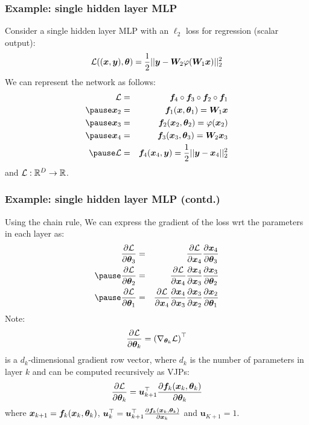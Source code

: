 \documentclass[smaller]{beamer}
\begin{document}
\begin{frame}
  \frametitle{Example: single hidden layer MLP}\pause

  Consider a single hidden layer MLP with an $\ell_2$ loss for regression (scalar output):\pause
  \begin{equation}
    \mathcal{L}((\bm x, \bm y),\bm{\theta}) = \frac12 ||\bm y - \bm W_2\varphi(\bm W_1\bm x)||_2^2
  \end{equation}
  \pause
  We can represent the network as follows:\pause
  \begin{eqnarray}
    \mc L &=& \bm f_4 \circ \bm f_3 \circ \bm f_2 \circ \bm f_1  \\\pause
    \bm x_2 &=& \bm f_1(\bm x, \bm\th_1) = \bm W_1 \bm x \\\pause
    \bm x_3 &=& \bm f_2(\bm x_2, \bm\th_2) = \varphi(\bm x_2) \\\pause
    \bm x_4 &=& \bm f_3(\bm x_3, \bm\th_3) = \bm W_2 \bm x_3 \\\pause
    \mc L &=& \bm f_4(\bm x_4, \bm y) = \fr12||\bm y - \bm x_4||_2^2
  \end{eqnarray}
  and $\mathcal L : \mathbb{R}^D \to \mathbb{R}$.
\end{frame}
\begin{frame}
  \frametitle{Example: single hidden layer MLP (contd.)}\pause

  Using the chain rule, We can express the gradient of the loss wrt the parameters in each layer as:\pause
  \begin{eqnarray}
    \pd{\mc L}{\bm\th_3} &=& \pd{\mc L}{\bm x_4} \pd{\bm x_4}{\bm\th_3} \\\pause
    \pd{\mc L}{\bm\th_2} &=& \pd{\mc L}{\bm x_4} \pd{\bm x_4}{\bm x_3} \pd{\bm x_3}{\bm\th_2} \\ \pause
    \pd{\mc L}{\bm\th_1} &=& \pd{\mc L}{\bm x_4} \pd{\bm x_4}{\bm x_3} \pd{\bm x_3}{\bm x_2} \pd{\bm x_2}{\bm\th_1}
  \end{eqnarray}
  \pause
  Note:
  \begin{equation}
    \frac{\partial{\mathcal L}}{\partial{\bm{\theta}_k}} = \left(\nabla_{\bm{\theta}_k} \mathcal L\right)^{\top}
  \end{equation}
  is a $d_k$-dimensional gradient row vector, where $d_k$ is the number of parameters in layer $k$ \pause and can be computed recursively as VJPs:
  \begin{equation}
    \frac{\partial{\mathcal L}}{\partial{\bm{\theta}_k}} = \bm u_{k+1}^{\top} \frac{\partial{\bm f_k(\bm x_k, \bm{\theta}_k)}}{\partial{\bm{\theta}_k}}
  \end{equation}
  where $\bm x_{k+1} = \bm f_k(\bm x_k, \bm{\theta}_k)$, $\bm u_{k}^{\top} = \bm u_{k+1}^{\top}\frac{\partial{\bm f_k(\bm x_k, \bm{\theta}_k)}}{\partial{\bm x_{k}}}$ and $\bm u_{K+1} = 1$.
\end{frame}
\end{document}
